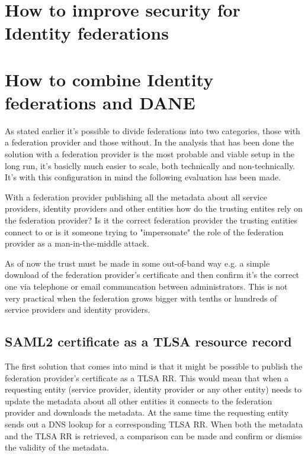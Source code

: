 \section{How to improve security for Identity federations}
\section{How to combine Identity federations and DANE}
As stated earlier it's possible to divide federations into two categories, those with a federation provider and those without.
In the analysis that has been done the solution with a federation provider is the most probable and viable setup in the long run, it's basiclly much easier to scale, both technically and non-technically.
It's with this configuration in mind the following evaluation has been made.


With a federation provider publishing all the metadata about all service providers, identity providers and other entities how do the trusting entites rely on the federation provider?
Is it the correct federation provider the trusting entities connect to or is it someone trying to "impersonate" the role of the federation provider as a man-in-the-middle attack.

As of now the trust must be made in some out-of-band way e.g. a simple download of the federation provider's certificate and then confirm it's the correct one via telephone or email communcation between administrators.
This is not very practical when the federation grows bigger with tenths or hundreds of service providers and identity providers.

\subsection{SAML2 certificate as a TLSA resource record}
The first solution that comes into mind is that it might be possible to publish the federation provider's certificate as a TLSA RR.
This would mean that when a requesting entity (service provider, identity provider or any other entity) needs to update the metadata about all other entities it connects to the federation provider and downloads the metadata.
At the same time the requesting entity sends out a DNS lookup for a corresponding TLSA RR.
When both the metadata and the TLSA RR is retrieved, a comparison can be made and confirm or dismiss the validity of the metadata.

